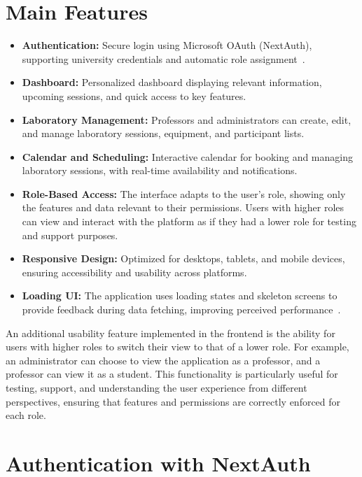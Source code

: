 \section{Main Features}
\begin{itemize}
    \item \textbf{Authentication:} Secure login using Microsoft OAuth (NextAuth), supporting university credentials and automatic role assignment~\cite{nextjs-authentication}.
    \item \textbf{Dashboard:} Personalized dashboard displaying relevant information, upcoming sessions, and quick access to key features.
    \item \textbf{Laboratory Management:} Professors and administrators can create, edit, and manage laboratory sessions, equipment, and participant lists.
    \item \textbf{Calendar and Scheduling:} Interactive calendar for booking and managing laboratory sessions, with real-time availability and notifications.
    \item \textbf{Role-Based Access:} The interface adapts to the user's role, showing only the features and data relevant to their permissions. Users with higher roles can view and interact with the platform as if they had a lower role for testing and support purposes.
    \item \textbf{Responsive Design:} Optimized for desktops, tablets, and mobile devices, ensuring accessibility and usability across platforms.
    \item \textbf{Loading UI:} The application uses loading states and skeleton screens to provide feedback during data fetching, improving perceived performance~\cite{nextjs-loading-ui}.
\end{itemize}

An additional usability feature implemented in the frontend is the ability for users with higher roles to switch their view to that of a lower role. For example, an administrator can choose to view the application as a professor, and a professor can view it as a student. This functionality is particularly useful for testing, support, and understanding the user experience from different perspectives, ensuring that features and permissions are correctly enforced for each role.

\section{Authentication with NextAuth}

